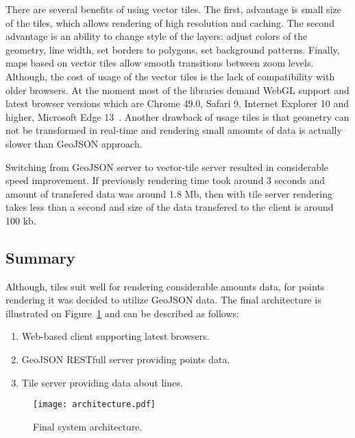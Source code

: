 There are several benefits of using vector tiles. The first, advantage is small size of the tiles,
which allows rendering of high resolution and caching. The second advantage is an ability to change
style of the layers: adjust colors of the geometry, line width, set borders to polygons,
set background patterns. Finally, maps based on vector tiles allow smooth transitions between
zoom levels. Although, the cost of usage of the vector tiles is the lack of
compatibility with older browsers. At the moment most of the libraries demand WebGL support and
latest browser versions which are Chrome 49.0, Safari 9, Internet Explorer 10 and higher,
Microsoft Edge 13~\cite{google:support,mapbox:support}. Another drawback of usage tiles is
that geometry can not be transformed in real-time and rendering small amounts of data is actually
slower than GeoJSON approach.

Switching from GeoJSON server to vector-tile server resulted in considerable speed improvement.
If previously rendering time took around 3 seconds and amount of transfered data was around 1.8 Mb,
then with tile server rendering takes less than a second and size of the data transfered to the
client is around 100 kb.


\subsection{ Summary }

Although, tiles suit well for rendering considerable amounts data, for points rendering it was
decided to utilize GeoJSON data. The final architecture is illustrated on
Figure~\ref{pic:architecture} and can be described as follows:

\begin{enumerate}
  \item Web-based client supporting latest browsers.
  \item GeoJSON RESTfull server providing points data.
  \item Tile server providing data about lines.
\end{enumerate}

\begin{figure}[t]
  \centering
  \texttt{[image: architecture.pdf]}
  \caption{Final system architecture.}
  \label{pic:architecture}
\end{figure}
